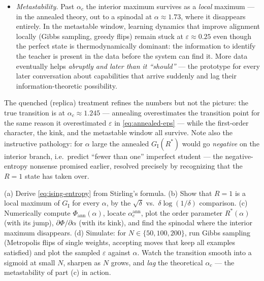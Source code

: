 \documentclass[11pt]{article}
\begin{document}
\begin{itemize}
  spike --- at finite $N$, a sigmoidal crossover in
  $\partial\Phi/\partial\alpha$ of width $\sim 1/N$ and a peak in
  $\partial^2\Phi/\partial\alpha^2$ whose height grows with $N$, exactly
  the taxonomy above.
  \item \emph{Metastability.} Past $\alpha_c$ the interior maximum survives
  as a \emph{local} maximum --- in the annealed theory, out to a spinodal
  at $\alpha \approx 1.73$, where it disappears entirely. In the
  metastable window, learning dynamics that improve alignment locally
  (Gibbs sampling, greedy flips) remain stuck at $\varepsilon \approx
  0.25$ even though the perfect state is thermodynamically dominant: the
  information to identify the teacher is present in the data before the
  system can find it. More data eventually helps \emph{abruptly and later
  than it ``should''} --- the prototype for every later conversation about
  capabilities that arrive suddenly and lag their information-theoretic
  possibility.
\end{itemize}
The quenched (replica) treatment refines the numbers but not the picture:
the true transition is at $\alpha_c \approx 1.245$ \cite{gyorgyi1990first}
--- annealing overestimates the transition point for the same reason it
overestimated $\varepsilon$ in \cref{eq:annealed-eps} --- while the
first-order character, the kink, and the metastable window all survive.
Note also the instructive pathology: for $\alpha$ large the annealed
$G_{\mathrm{I}}(R^*)$ would go \emph{negative} on the interior branch,
i.e.\ predict ``fewer than one'' imperfect student --- the negative-entropy
nonsense promised earlier, resolved precisely by recognizing that the
$R = 1$ state has taken over.

\begin{exercise}
\label{ex:ising}
\important
(a) Derive \cref{eq:ising-entropy} from Stirling's formula.
(b) Show that $R = 1$ is a local maximum of $G_{\mathrm{I}}$ for every
$\alpha$, by the $\sqrt{\delta}$ vs.\ $\delta\log(1/\delta)$ comparison.
(c) Numerically compute $\Phi_{\mathrm{ann}}(\alpha)$, locate
$\alpha_c^{\mathrm{ann}}$, plot the order parameter $R^*(\alpha)$ (with its
jump), $\partial\Phi/\partial\alpha$ (with its kink), and find the spinodal
where the interior maximum disappears.
(d) Simulate: for $N \in \{50, 100, 200\}$, run Gibbs sampling (Metropolis
flips of single weights, accepting moves that keep all examples satisfied)
and plot the sampled $\varepsilon$ against $\alpha$. Watch the transition
smooth into a sigmoid at small $N$, sharpen as $N$ grows, and \emph{lag}
the theoretical $\alpha_c$ --- the metastability of part (c) in action.
\end{exercise}
\end{document}
